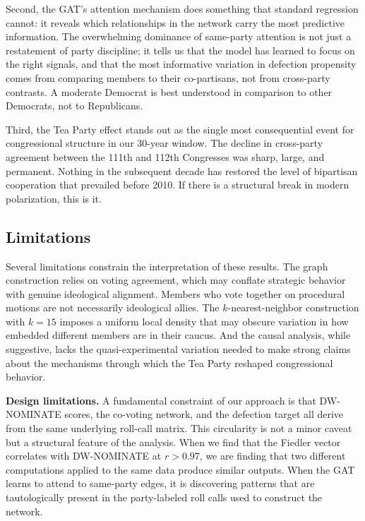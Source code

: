 \documentclass[11pt]{article}
\begin{document}
Second, the GAT's attention mechanism does something that standard regression cannot: it reveals which relationships in the network carry the most predictive information. The overwhelming dominance of same-party attention is not just a restatement of party discipline; it tells us that the model has learned to focus on the right signals, and that the most informative variation in defection propensity comes from comparing members to their co-partisans, not from cross-party contrasts. A moderate Democrat is best understood in comparison to other Democrats, not to Republicans.

Third, the Tea Party effect stands out as the single most consequential event for congressional structure in our 30-year window. The decline in cross-party agreement between the 111th and 112th Congresses was sharp, large, and permanent. Nothing in the subsequent decade has restored the level of bipartisan cooperation that prevailed before 2010. If there is a structural break in modern polarization, this is it.

\subsection{Limitations}

Several limitations constrain the interpretation of these results. The graph construction relies on voting agreement, which may conflate strategic behavior with genuine ideological alignment. Members who vote together on procedural motions are not necessarily ideological allies. The $k$-nearest-neighbor construction with $k=15$ imposes a uniform local density that may obscure variation in how embedded different members are in their caucus. And the causal analysis, while suggestive, lacks the quasi-experimental variation needed to make strong claims about the mechanisms through which the Tea Party reshaped congressional behavior.

\textbf{Design limitations.} A fundamental constraint of our approach is that DW-NOMINATE scores, the co-voting network, and the defection target all derive from the same underlying roll-call matrix. This circularity is not a minor caveat but a structural feature of the analysis. When we find that the Fiedler vector correlates with DW-NOMINATE at $r > 0.97$, we are finding that two different computations applied to the same data produce similar outputs. When the GAT learns to attend to same-party edges, it is discovering patterns that are tautologically present in the party-labeled roll calls used to construct the network.
\end{document}
